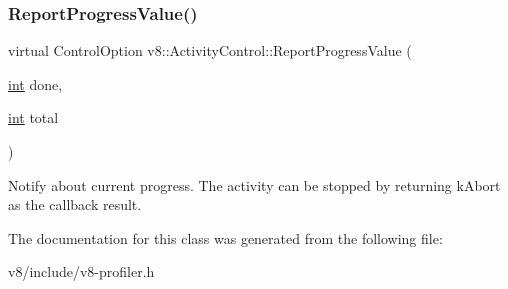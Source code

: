 \subsubsection{\texorpdfstring{Report\+Progress\+Value()}{ReportProgressValue()}}
{\footnotesize\ttfamily virtual Control\+Option v8\+::\+Activity\+Control\+::\+Report\+Progress\+Value (\begin{DoxyParamCaption}\item[{\mbox{\hyperlink{classint}{int}}}]{done,  }\item[{\mbox{\hyperlink{classint}{int}}}]{total }\end{DoxyParamCaption})\hspace{0.3cm}{\ttfamily [pure virtual]}}

Notify about current progress. The activity can be stopped by returning k\+Abort as the callback result. 

The documentation for this class was generated from the following file\+:\begin{DoxyCompactItemize}
\item 
v8/include/v8-\/profiler.\+h\end{DoxyCompactItemize}

